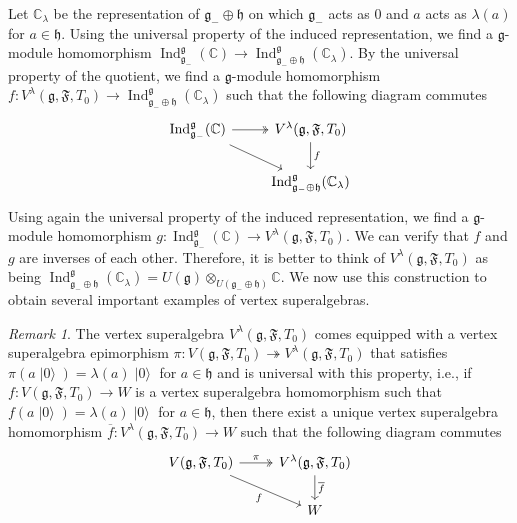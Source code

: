 \documentclass[a4paper, 12pt, reqno]{amsart}
\theoremstyle{remark}
\newtheorem{remark}[theorem]{Remark}
\DeclareMathOperator{\Ind}{Ind}
\DeclareMathOperator{\vac}{|0\rangle}
\begin{document}
Let $\mathbb{C}_{\lambda}$ be the representation of $\mathfrak{g}_- \oplus \mathfrak{h}$ on which $\mathfrak{g}_-$ acts as $0$ and $a$ acts as $\lambda(a)$ for $a \in \mathfrak{h}$.
Using the universal property of the induced representation, we find a $\mathfrak{g}$-module homomorphism $\Ind^{\mathfrak{g}}_{\mathfrak{g}_-}(\mathbb{C}) \to \Ind^{\mathfrak{g}}_{\mathfrak{g}_- \oplus \mathfrak{h}}(\mathbb{C}_{\lambda})$.
By the universal property of the quotient, we find a $\mathfrak{g}$-module homomorphism $f: V^{\lambda}(\mathfrak{g}, \mathfrak{F}, T_0) \to \Ind^{\mathfrak{g}}_{\mathfrak{g}_- \oplus \mathfrak{h}}(\mathbb{C}_{\lambda})$ such that the following diagram commutes
\begin{equation*}
  \begin{tikzcd}
    {\Ind^{\mathfrak{g}}_{\mathfrak{g}_-}(\mathbb{C})} \arrow[rd] \arrow[r, two heads] & {V^{\lambda}(\mathfrak{g}, \mathfrak{F}, T_0)} \arrow[d, "f"] \\
    & \Ind^{\mathfrak{g}}_{\mathfrak{g}_- \oplus \mathfrak{h}}(\mathbb{C}_{\lambda})
  \end{tikzcd}
\end{equation*}
Using again the universal property of the induced representation, we find a $\mathfrak{g}$-module homomorphism $g: \Ind^{\mathfrak{g}}_{\mathfrak{g}_-}(\mathbb{C}) \to V^{\lambda}(\mathfrak{g}, \mathfrak{F}, T_0)$.
We can verify that $f$ and $g$ are inverses of each other.
Therefore, it is better to think of $V^{\lambda}(\mathfrak{g}, \mathfrak{F}, T_0)$ as being $\Ind^{\mathfrak{g}}_{\mathfrak{g}_- \oplus \mathfrak{h}}(\mathbb{C}_{\lambda}) = U(\mathfrak{g}) \otimes_{U(\mathfrak{g}_- \oplus \mathfrak{h})} \mathbb{C}$.
We now use this construction to obtain several important examples of vertex superalgebras.

\begin{remark}
  \label{rmk:15}
  The vertex superalgebra $V^{\lambda}(\mathfrak{g}, \mathfrak{F}, T_0)$ comes equipped with a vertex superalgebra epimorphism $\pi: V(\mathfrak{g}, \mathfrak{F}, T_0) \twoheadrightarrow V^{\lambda}(\mathfrak{g}, \mathfrak{F}, T_0)$ that satisfies $\pi(a\vac) = \lambda(a)\vac$ for $a \in \mathfrak{h}$ and is universal with this property, i.e., if $f: V(\mathfrak{g}, \mathfrak{F}, T_0) \to W$ is a vertex superalgebra homomorphism such that $f(a\vac) = \lambda(a)\vac$ for $a \in \mathfrak{h}$, then there exist a unique vertex superalgebra homomorphism $\overline{f}: V^{\lambda}(\mathfrak{g}, \mathfrak{F}, T_0) \to W$ such that the following diagram commutes
  \begin{equation*}
    \begin{tikzcd}
      {V(\mathfrak{g}, \mathfrak{F}, T_0)} \arrow[rd, "f"'] \arrow[r, "\pi", two heads] & {V^{\lambda}(\mathfrak{g}, \mathfrak{F}, T_0)} \arrow[d, "\overline{f}"] \\
      & W
    \end{tikzcd}
  \end{equation*}
\end{remark}
\end{document}
